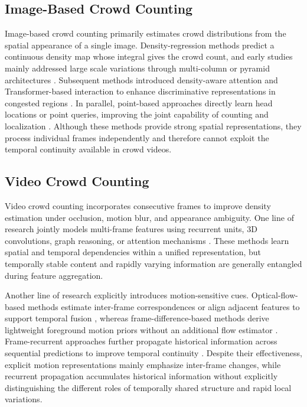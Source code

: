 \documentclass[lettersize,journal]{IEEEtran}
\begin{document}
\subsection{Image-Based Crowd Counting}
Image-based crowd counting primarily estimates crowd distributions from the spatial appearance of a single image. Density-regression methods predict a continuous density map whose integral gives the crowd count, and early studies mainly addressed large scale variations through multi-column or pyramid architectures \cite{sindagi2017generating,chen2019scale,yang2020embedding}. Subsequent methods introduced density-aware attention and Transformer-based interaction to enhance discriminative representations in congested regions \cite{jiang2020attention,lin2022boosting,lin2024gramformer}. In parallel, point-based approaches directly learn head locations or point queries, improving the joint capability of counting and localization \cite{song2021rethinking,liang2022focal,liu2023point,chen2024improving}. Although these methods provide strong spatial representations, they process individual frames independently and therefore cannot exploit the temporal continuity available in crowd videos.

\subsection{Video Crowd Counting}
Video crowd counting incorporates consecutive frames to improve density estimation under occlusion, motion blur, and appearance ambiguity. One line of research jointly models multi-frame features using recurrent units, 3D convolutions, graph reasoning, or attention mechanisms \cite{xiong2017spatiotemporal,zou2019enhanced,ma2021spatiotemporal,wu2022spatial,cai2022global,dong2022clrnet,ling2025dual,ling2026dual,ling2026cascaded}. These methods learn spatial and temporal dependencies within a unified representation, but temporally stable content and rapidly varying information are generally entangled during feature aggregation.

Another line of research explicitly introduces motion-sensitive cues. Optical-flow-based methods estimate inter-frame correspondences or align adjacent features to support temporal fusion \cite{hossain2020video,hou2023frame,cao2024efficient}, whereas frame-difference-based methods derive lightweight foreground motion priors without an additional flow estimator \cite{ling2023motional}. Frame-recurrent approaches further propagate historical information across sequential predictions to improve temporal continuity \cite{hou2023frame}. Despite their effectiveness, explicit motion representations mainly emphasize inter-frame changes, while recurrent propagation accumulates historical information without explicitly distinguishing the different roles of temporally shared structure and rapid local variations.
\end{document}
